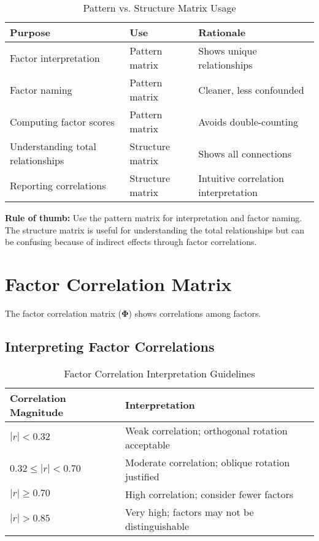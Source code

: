 \documentclass[a4paper]{tufte-book}
\begin{document}
\begin{table}[h]
\centering
\caption{Pattern vs. Structure Matrix Usage}
\begin{tabular}{@{}lll@{}}
\toprule
\textbf{Purpose} & \textbf{Use} & \textbf{Rationale} \\
\midrule
Factor interpretation & Pattern matrix & Shows unique relationships \\
Factor naming & Pattern matrix & Cleaner, less confounded \\
Computing factor scores & Pattern matrix & Avoids double-counting \\
Understanding total relationships & Structure matrix & Shows all connections \\
Reporting correlations & Structure matrix & Intuitive correlation interpretation \\
\bottomrule
\end{tabular}
\end{table}

\begin{learningtip}
\textbf{Rule of thumb:} Use the pattern matrix for interpretation and factor naming. The structure matrix is useful for understanding the total relationships but can be confusing because of indirect effects through factor correlations.
\end{learningtip}

\section{Factor Correlation Matrix}

The factor correlation matrix ($\boldsymbol{\Phi}$) shows correlations among factors.

\subsection{Interpreting Factor Correlations}

\begin{table}[h]
\centering
\caption{Factor Correlation Interpretation Guidelines}
\begin{tabular}{@{}ll@{}}
\toprule
\textbf{Correlation Magnitude} & \textbf{Interpretation} \\
\midrule
$|r| < 0.32$ & Weak correlation; orthogonal rotation acceptable \\
$0.32 \leq |r| < 0.70$ & Moderate correlation; oblique rotation justified \\
$|r| \geq 0.70$ & High correlation; consider fewer factors \\
$|r| > 0.85$ & Very high; factors may not be distinguishable \\
\bottomrule
\end{tabular}
\end{table}
\end{document}
